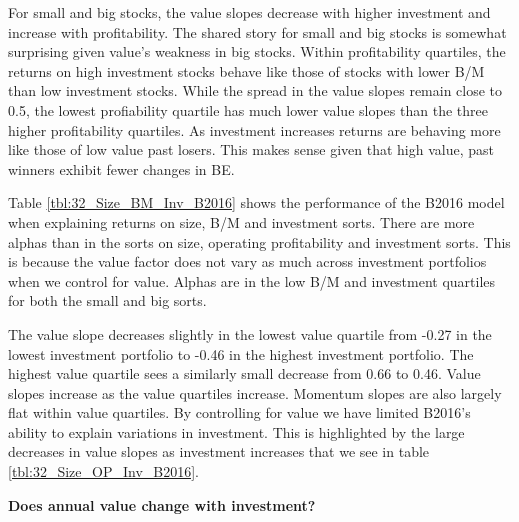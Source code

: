For small and big stocks, the value slopes decrease with higher investment and increase
with profitability. The shared story for small and big stocks is somewhat surprising given
value's weakness in big stocks. Within profitability quartiles, the returns on high
investment stocks behave like those of stocks with lower B/M than low investment stocks.
While the spread in the value slopes remain close to 0.5, the lowest profiability quartile
has much lower value slopes than the three higher profitability quartiles. As investment
increases returns are behaving more like those of low value past losers. This makes sense
given that high value, past winners exhibit fewer changes in BE.


Table \ref{tbl:32_Size_BM_Inv_B2016} shows the performance of the B2016 model when
explaining returns on size, B/M and investment sorts. There are more alphas than in the
sorts on size, operating profitability and investment sorts. This is because the value
factor does not vary as much across investment portfolios when we control for value.
Alphas are in the low B/M and investment quartiles for both the small and big sorts.

The value slope decreases slightly in the lowest value quartile from -0.27 in the lowest
investment portfolio to -0.46 in the highest investment portfolio. The highest value
quartile sees a similarly small decrease from 0.66 to 0.46. Value slopes increase as the
value quartiles increase. Momentum slopes are also largely flat within value quartiles. By
controlling for value we have limited B2016's ability to explain variations in investment.
This is highlighted by the large decreases in value slopes as investment increases that we
see in table \ref{tbl:32_Size_OP_Inv_B2016}.

\textbf{Does annual value change with investment?}
